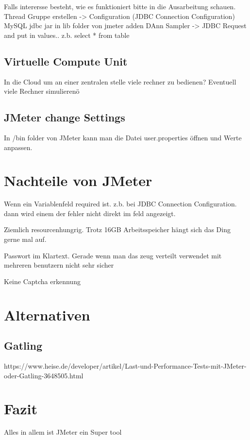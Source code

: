 \documentclass[a4paper,12pt]{article}
\begin{document}
Falls interersse besteht, wie es funktioniert bitte in die Ausarbeitung schauen.
Thread Gruppe erstellen -> Configuration (JDBC Connection Configuration)
MySQL jdbc jar in lib folder von jmeter adden 
DAnn Sampler -> JDBC Request and put in values.. z.b. select * from table


\subsection{Virtuelle Compute Unit}
In die Cloud um an einer zentralen stelle viele rechner zu bedienen?
Eventuell viele Rechner simulierenö

\subsection{JMeter change Settings}
In /bin folder von JMeter kann man die Datei user.properties öffnen und Werte anpassen.

\section{Nachteile von JMeter}
Wenn ein Variablenfeld required ist. z.b. bei JDBC Connection Configuration. dann wird einem der fehler nicht direkt im feld angezeigt.

Ziemlich resourcenhungrig. Trotz 16GB Arbeitsspeicher hängt sich das Ding gerne mal auf.

Passwort im Klartext. Gerade wenn man das zeug verteilt verwendet mit mehreren benutzern nicht sehr sicher

Keine Captcha erkennung
\section{Alternativen}
\subsection{Gatling}
https://www.heise.de/developer/artikel/Last-und-Performance-Tests-mit-JMeter-oder-Gatling-3648505.html

\section{Fazit}
Alles in allem ist JMeter ein Super tool

\pagebreak
\thispagestyle{empty}


\end{document}
